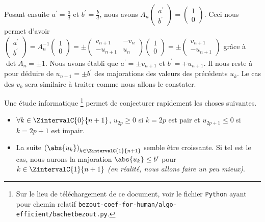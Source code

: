 Posant ensuite $a^\prime = \frac{a}{d}$ et  $b^\prime = \frac{b}{d}$, nous avons
$A_n
 \begin{pmatrix}
 	a^\prime  \\
	b^\prime
 \end{pmatrix}
 =
 \begin{pmatrix}
 	1 \\
	0	
 \end{pmatrix}$.
Ceci nous permet d'avoir
$\begin{pmatrix}
 	a^\prime  \\
	b^\prime
 \end{pmatrix}
 =
 A_n^{-1}
 \begin{pmatrix}
 	1 \\
	0	
 \end{pmatrix}
 =
 \pm
 \begin{pmatrix}
	 v_{n+1}  & -v_n     \\
	 -u_{n+1} & u_n	
 \end{pmatrix}
 \begin{pmatrix}
 	1 \\
	0	
 \end{pmatrix}
 =
 \pm
 \begin{pmatrix}
 	v_{n+1}  \\
	-u_{n+1}	
 \end{pmatrix}$
grâce à $\det A_n = \pm 1$.
Nous avons établi que $a^\prime = \pm v_{n+1}$ et $b^\prime = \mp u_{n+1}$. Il nous reste à  pour déduire de $u_{n+1} = \pm b^\prime$ des majorations des valeurs des précédents $u_k$. Le cas des $v_k$ sera similaire à traiter comme nous allons le constater.


\medskip


Une étude informatique
\footnote{
	Sur le lieu de téléchargement de ce document, voir le fichier \texttt{Python} ayant pour chemin relatif \texttt{bezout-coef-for-human/algo-efficient/bachetbezout.py}.
}
permet de conjecturer rapidement les choses suivantes.

\begin{itemize}[label = \small\textbullet]
	\item $\forall k \in \ZintervalC{0}{n+1}$, $u_{2p} \geq 0$ si $k = 2p$ est pair et $u_{2p+1} \leq 0$ si $k = 2p+1$ est impair.


	\item La suite $\left( \abs{u_k} \right)_{k \in \ZintervalC{1}{n+1}}$ semble être croissante. Si tel est le cas, nous aurons la majoration $\abs{u_k} \leq b^\prime$ pour $k \in \ZintervalC{1}{n+1}$ \emph{(en réalité, nous allons faire un peu mieux)}.
\end{itemize}


